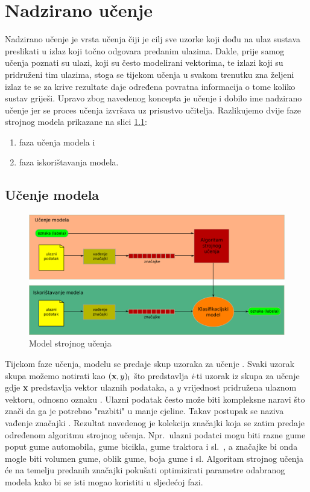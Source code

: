 \documentclass[times, utf8, zavrsni]{fer}
\begin{document}
\chapter{Nadzirano učenje}
Nadzirano učenje  je vrsta učenja čiji je cilj sve uzorke koji dođu na ulaz sustava preslikati u izlaz koji točno odgovara predanim ulazima. Dakle, prije samog učenja poznati su ulazi, koji su često modelirani vektorima, te izlazi koji su pridruženi tim ulazima, stoga se tijekom učenja u svakom trenutku zna željeni izlaz te se za krive rezultate daje određena povratna informacija  o tome koliko sustav griješi. Upravo zbog navedenog koncepta je učenje i dobilo ime nadzirano učenje jer se proces učenja izvršava uz prisustvo učitelja. Razlikujemo dvije faze strojnog modela prikazane na slici \ref{fig:supervised-learning-flow}:
\begin{enumerate}
    \item faza učenja modela i
    \item faza iskorištavanja modela.
\end{enumerate}

\section{Učenje modela}

\begin{figure}[H]
    \centering
    \includegraphics[scale=0.5]{img/supervised-learning-flow.png}
    \caption[Caption for LOF]{Model strojnog učenja\footnotemark}
    \label{fig:supervised-learning-flow}
\end{figure}

Tijekom faze učenja, modelu se predaje skup uzoraka za učenje . Svaki uzorak skupa možemo notirati kao $(\textbf{x}, y)\textsubscript{i}$ što predstavlja \textit{i}-ti uzorak iz skupa za učenje gdje \textbf{x} predstavlja vektor ulaznih podataka, a \textit{y} vrijednost pridružena ulaznom vektoru, odnosno oznaku . Ulazni podatak često može biti kompleksne naravi što znači da ga je potrebno "razbiti" u manje cjeline. Takav postupak se naziva vađenje značajki . Rezultat navedenog je kolekcija značajki koja se zatim predaje određenom algoritmu strojnog učenja. Npr.\ ulazni podatci mogu biti razne gume poput gume automobila, gume bicikla, gume traktora i sl.\ , a značajke bi onda mogle biti volumen gume, oblik gume, boja gume i sl. Algoritam strojnog učenja će na temelju predanih značajki pokušati optimizirati parametre odabranog modela kako bi se isti mogao koristiti u sljedećoj fazi.
\end{document}
